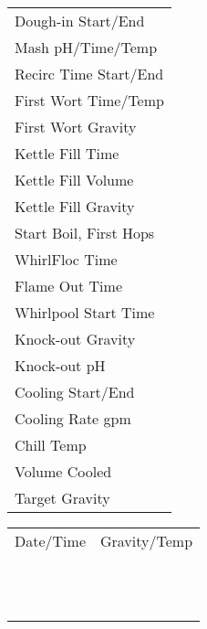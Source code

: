 \documentclass[12pt]{article}
\newcommand{\formline}[1][4cm]{\uline{\hspace{#1}}}
\begin{document}
\begin{multicols}{2}
\noindent
\begin{tabular}{l}
Dough-in Start/End \formline[5cm] \\
Mash pH/Time/Temp \formline[5cm] \\
Recirc Time Start/End \formline[5cm] \\
First Wort Time/Temp \formline[5cm] \\
First Wort Gravity \formline[5cm] \\
Kettle Fill Time \formline[5cm] \\
Kettle Fill Volume \formline[5cm] \\
Kettle Fill Gravity \formline[5cm] \\
Start Boil, First Hops \formline[5cm] \\
WhirlFloc Time \formline[5cm] \\
Flame Out Time \formline[5cm] \\
Whirlpool Start Time \formline[5cm] \\
Knock-out Gravity \formline[5cm] \\
Knock-out pH \formline[5cm] \\
Cooling Start/End \formline[5cm] \\
Cooling Rate gpm \formline[5cm] \\
Chill Temp \formline[5cm] \\
Volume Cooled \formline[5cm] \\
Target Gravity \formline[5cm] \\
\end{tabular}

\columnbreak

\noindent{}

\vspace{0.2cm}

\noindent
\begin{tabular}{ll}
Date/Time & Gravity/Temp \\
\formline[3cm] & \formline[3cm] \\
\formline[3cm] & \formline[3cm] \\
\formline[3cm] & \formline[3cm] \\
\formline[3cm] & \formline[3cm] \\
\formline[3cm] & \formline[3cm] \\
\formline[3cm] & \formline[3cm] \\
\formline[3cm] & \formline[3cm] \\
\formline[3cm] & \formline[3cm] \\
\formline[3cm] & \formline[3cm] \\
\formline[3cm] & \formline[3cm] \\
\formline[3cm] & \formline[3cm] \\
\formline[3cm] & \formline[3cm] \\
\end{tabular}

\end{multicols}
\end{document}
